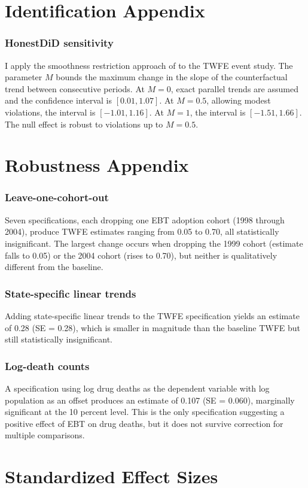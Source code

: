 \documentclass[12pt]{article}
\begin{document}
\section{Identification Appendix}

\subsubsection*{HonestDiD sensitivity} I apply the smoothness restriction approach of \citet{rambachan2023more} to the TWFE event study. The parameter $M$ bounds the maximum change in the slope of the counterfactual trend between consecutive periods. At $M = 0$, exact parallel trends are assumed and the confidence interval is $[0.01, 1.07]$. At $M = 0.5$, allowing modest violations, the interval is $[-1.01, 1.16]$. At $M = 1$, the interval is $[-1.51, 1.66]$. The null effect is robust to violations up to $M = 0.5$.

\section{Robustness Appendix}

\subsubsection*{Leave-one-cohort-out} Seven specifications, each dropping one EBT adoption cohort (1998 through 2004), produce TWFE estimates ranging from 0.05 to 0.70, all statistically insignificant. The largest change occurs when dropping the 1999 cohort (estimate falls to 0.05) or the 2004 cohort (rises to 0.70), but neither is qualitatively different from the baseline.

\subsubsection*{State-specific linear trends} Adding state-specific linear trends to the TWFE specification yields an estimate of 0.28 (SE = 0.28), which is smaller in magnitude than the baseline TWFE but still statistically insignificant.

\subsubsection*{Log-death counts} A specification using log drug deaths as the dependent variable with log population as an offset produces an estimate of 0.107 (SE = 0.060), marginally significant at the 10 percent level. This is the only specification suggesting a positive effect of EBT on drug deaths, but it does not survive correction for multiple comparisons.

\section{Standardized Effect Sizes}
\label{sec:sde}


\end{document}
